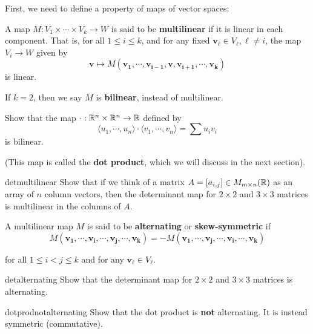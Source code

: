 First, we need to define a property of maps of vector spaces:

\begin{definition}
    A map $M : V_1 \times \cdots \times V_k \to W$ is said to be \textbf{multilinear} if it is linear in each component.  That is, for all $1 \leq i \leq k$, and for any fixed $\bm{v_\ell} \in V_\ell, \ell \neq i$, the map $V_i \to W$ given by $$\bm{v} \mapsto M(\bm{v_1}, \cdots, \bm{v_{i-1}}, \bm{v}, \bm{v_{i+1}}, \cdots, \bm{v_k})$$ is linear.
    
    If $k=2$, then we say $M$ is \textbf{bilinear}, instead of multilinear.
    \end{definition}

\begin{problem}
    Show that the map $\cdot : \mathbb{R}^n \times \mathbb{R}^n \to \mathbb{R}$ defined by $$\langle u_1, \cdots, u_n \rangle \cdot \langle v_1 , \cdots, v_n \rangle = \sum u_iv_i$$
    is bilinear. 
    
    (This map is called the \textbf{dot product}, which we will discuss in the next section). 
\end{problem}


\begin{problem}{detmultilinear}
    Show that if we think of a matrix $A = [a_{i,j}] \in M_{m \times n}(\mathbb{R})$ as an array of $n$ column vectors, then the determinant map for $2 \times 2$ and $3 \times 3$ matrices is multilinear in the columns of $A$.
\end{problem}

\begin{definition}
    A multilinear map $M$ is said to be \textbf{alternating} or \textbf{skew-symmetric} if 
    $$M(\bm{v_1}, \cdots, \bm{v_i}, \cdots , \bm{v_j}, \cdots, \bm{v_k}) = -M(\bm{v_1}, \cdots, \bm{v_j}, \cdots , \bm{v_i}, \cdots, \bm{v_k}) $$
    
    for all $1 \leq i < j \leq k$ and for any $\bm{v_\ell} \in V_\ell$.
    
    \end{definition}
    
    \begin{problem}{detalternating}
        Show that the determinant map for $2 \times 2$ and $3 \times 3$ matrices is alternating.
    \end{problem}
    
    \begin{problem}{dotprodnotalternating}
        Show that the dot product is \textbf{not} alternating.  It is instead symmetric (commutative).
    \end{problem}

